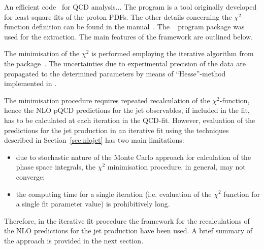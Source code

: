 An efficient code~\cite{herafitter} for QCD analysis...  The \herafitter program is a tool originally developed for least-square fits of the proton PDFs. The other details concerning the $\chi^2$-function definition can be found in the \herafitter manual~\cite{herafitter:2014:manual}. The \herafitter~\cite{Aaron:2009aa,Aaron:2009kv} program package was used for the \as extraction. The main features of the \herafitter framework are outlined below.

The minimisation of the $\chi^2$ is performed employing the iterative \migrad algorithm from the \minuit package~\cite{James:1975dr}. The uncertainties due to experimental precision of the data are propagated to the determined parameters by means of ``Hesse''-method implemented in \minuit.

The minimisation procedure requires repeated recalculation of the $\chi^2$-function, hence the NLO pQCD predictions for the jet observables, if included in the fit, has to be calculated at each iteration in the QCD-fit. However, evaluation of the predictions for the jet production in an iterative fit using the techniques described in Section~\ref{sec:nlojet} has two main limitations: 
\begin{itemize}
 \item due to stochastic nature of the Monte Carlo approach for calculation of the phase space integrals, the $\chi^2$ minimisation procedure,  in general, may not converge;
 \item the computing time for a single iteration (i.e. evaluation of the $\chi^2$ function for a single fit parameter value) is prohibitively long.
\end{itemize}
Therefore, in the iterative fit procedure the \fastnlo framework for the recalculations of the NLO predictions for the jet production have been used. A brief summary of the \fastnlo approach is provided in the next section. 
